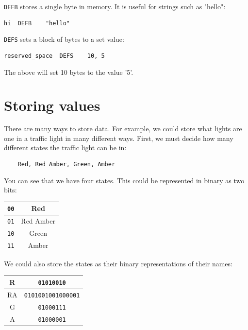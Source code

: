 
{\tt DEFB} stores a single byte in memory. It is useful for strings such as
"hello":

\begin{verbatim}
hi	DEFB	"hello"
\end{verbatim}

{\tt DEFS} sets a block of bytes to a set value:

\begin{verbatim}
reserved_space	DEFS	10, 5
\end{verbatim}

The above will set 10 bytes to the value '5'.

\section{Storing values}


There are many ways to store data. For example, we could store what lights are
one in a traffic light in many different ways. First, we must decide how many
different states the traffic light can be in:

\begin{verbatim}
	Red, Red Amber, Green, Amber
\end{verbatim}

You can see that we have four states. This could be represented in binary as two
bits:

\begin{center}
	\begin{tabular}{|c|c|}
		\hline
		{\tt 00} & Red\\ \hline
		{\tt 01} & Red Amber\\ \hline
		{\tt 10} & Green\\ \hline
		{\tt 11} & Amber\\ \hline
	\end{tabular}
\end{center}

We could also store the states as their binary representations of their names:

\begin{center}
	\begin{tabular}{|c|c|}
		\hline
		R & {\tt 01010010}\\ \hline
		RA & {\tt 0101001001000001}\\ \hline
		G & {\tt 01000111}\\ \hline
		A & {\tt 01000001}\\ \hline
	\end{tabular}
\end{center}

